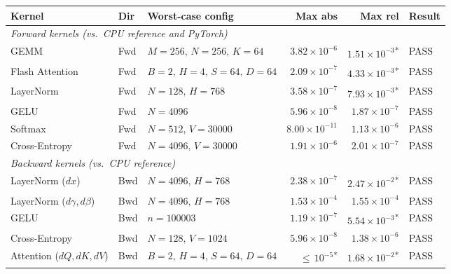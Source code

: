 \documentclass[11pt,letterpaper]{article}
\begin{document}
\begin{table}[h]
  \centering\small\setlength{\tabcolsep}{4pt}
  \begin{tabular}{@{}lllrrl@{}}
    \toprule
    \textbf{Kernel} & \textbf{Dir} & \textbf{Worst-case config} &
    \textbf{Max abs} & \textbf{Max rel} & \textbf{Result} \\
    \midrule
    \multicolumn{6}{l}{\textit{Forward kernels (vs.\ CPU reference and PyTorch)}} \\
    GEMM                         & Fwd & $M{=}256,\,N{=}256,\,K{=}64$       & $3.82\times10^{-6}$      & $1.51\times10^{-3}$\textsuperscript{*} & PASS \\
    Flash Attention              & Fwd & $B{=}2,\,H{=}4,\,S{=}64,\,D{=}64$ & $2.09\times10^{-7}$      & $4.33\times10^{-3}$\textsuperscript{*} & PASS \\
    LayerNorm                    & Fwd & $N{=}128,\,H{=}768$                & $3.58\times10^{-7}$      & $7.93\times10^{-3}$\textsuperscript{*} & PASS \\
    GELU                         & Fwd & $N{=}4096$                          & $5.96\times10^{-8}$      & $1.87\times10^{-7}$                    & PASS \\
    Softmax                      & Fwd & $N{=}512,\,V{=}30000$               & $8.00\times10^{-11}$     & $1.13\times10^{-6}$                    & PASS \\
    Cross-Entropy                & Fwd & $N{=}4096,\,V{=}30000$              & $1.91\times10^{-6}$      & $2.01\times10^{-7}$                    & PASS \\
    \midrule
    \multicolumn{6}{l}{\textit{Backward kernels (vs.\ CPU reference)}} \\
    LayerNorm ($dx$)             & Bwd & $N{=}4096,\,H{=}768$               & $2.38\times10^{-7}$      & $2.47\times10^{-2}$\textsuperscript{*} & PASS \\
    LayerNorm ($d\gamma,d\beta$) & Bwd & $N{=}4096,\,H{=}768$               & $1.53\times10^{-4}$      & $1.55\times10^{-4}$                    & PASS \\
    GELU                         & Bwd & $n{=}100003$                        & $1.19\times10^{-7}$      & $5.54\times10^{-3}$\textsuperscript{*} & PASS \\
    Cross-Entropy                & Bwd & $N{=}128,\,V{=}1024$               & $5.96\times10^{-8}$      & $1.38\times10^{-6}$                    & PASS \\
    Attention ($dQ,dK,dV$)       & Bwd & $B{=}2,\,H{=}4,\,S{=}64,\,D{=}64$ & ${\leq}\,10^{-5}$\textsuperscript{*} & $1.68\times10^{-2}$\textsuperscript{*} & PASS \\

\end{tabular}
\end{table}
\end{document}
